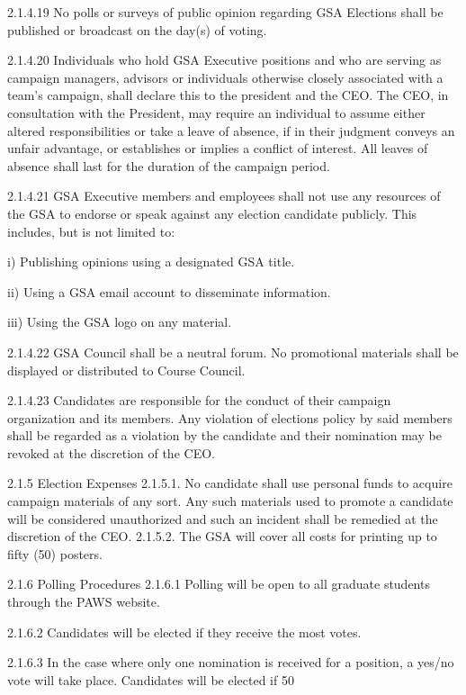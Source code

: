  2.1.4.19 No polls or surveys of public opinion regarding GSA Elections 
 shall be published or broadcast on the day(s) of voting. 
 
 2.1.4.20 Individuals who hold GSA Executive positions and who are 
 serving as campaign managers, advisors or individuals otherwise 
 closely associated with a team’s campaign, shall declare this to 
 the president and the CEO. The CEO, in consultation with the 
 President, may require an individual to assume either altered responsibilities or take a leave of absence, if in their judgment 
 conveys an unfair advantage, or establishes or implies a conflict 
 of interest. All leaves of absence shall last for the duration of the 
 campaign period. 
 
 2.1.4.21 GSA Executive members and employees shall not use any 
 resources of the GSA to endorse or speak against any election 
 candidate publicly. This includes, but is not limited to: 
 
 i) Publishing opinions using a designated GSA title. 
 
 ii) Using a GSA email account to disseminate information. 
 
 iii) Using the GSA logo on any material. 
 
 
 2.1.4.22 GSA Council shall be a neutral forum. No promotional materials 
 shall be displayed or distributed to Course Council. 
 
 2.1.4.23 Candidates are responsible for the conduct of their campaign 
 organization and its members. Any violation of elections policy 
 by said members shall be regarded as a violation by the candidate 
 and their nomination may be revoked at the discretion of the 
 CEO. 
 
 2.1.5 Election Expenses 
 2.1.5.1. No candidate shall use personal funds to acquire campaign 
 materials of any sort. Any such materials used to promote a 
 candidate will be considered unauthorized and such an incident 
 shall be remedied at the discretion of the CEO. 
 2.1.5.2. The GSA will cover all costs for printing up to fifty (50) posters. 
 
 2.1.6 Polling Procedures 
 2.1.6.1 Polling will be open to all graduate students through the PAWS 
 website. 
 
 2.1.6.2 Candidates will be elected if they receive the most votes. 
 
 2.1.6.3 In the case where only one nomination is received for a position, a 
 yes/no vote will take place. Candidates will be elected if 50%
 

